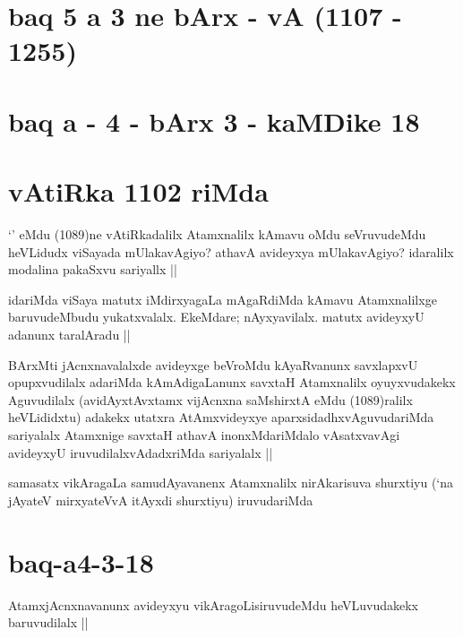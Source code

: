 \section*{baq 5 a 3 ne bArx - vA (1107 - 1255)}

\section*{baq a - 4 - bArx 3 - kaMDike 18}

\section*{vAtiRka 1102 riMda} 

\begin{artha}
`\stext' eMdu (1089)ne vAtiRkadalilx Atamxnalilx kAmavu oMdu seVruvudeMdu heVLidudx viSayada mUlakavAgiyo? athavA avideyxya mUlakavAgiyo? idaralilx modalina pakaSxvu sariyallx ||
\end{artha}

\begin{artha}
idariMda viSaya matutx iMdirxyagaLa mAgaRdiMda kAmavu Atamxnalilxge baruvudeMbudu yukatxvalalx. EkeMdare; nAyxyavilalx. matutx avideyxyU adanunx taralAradu ||
\end{artha}


\begin{artha}
BArxMti jAcnxnavalalxde avideyxge beVroMdu kAyaRvanunx savxlapxvU opupxvudilalx adariMda kAmAdigaLanunx savxtaH Atamxnalilx oyuyxvudakekx Aguvudilalx (avidAyxtAvxtamx vijAcnxna saMshirxtA eMdu (1089)ralilx heVLididxtu) adakekx utatxra AtAmxvideyxye aparxsidadhxvAguvudariMda sariyalalx Atamxnige savxtaH athavA inonxMdariMdalo vAsatxvavAgi avideyxyU iruvudilalxvAdadxriMda sariyalalx || 
\end{artha}


\begin{artha}
samasatx vikAragaLa samudAyavanenx Atamxnalilx nirAkarisuva shurxtiyu (`na jAyateV mirxyateVvA itAyxdi shurxtiyu) iruvudariMda
\end{artha}

\section*{baq-a4-3-18}

\begin{artha}
AtamxjAcnxnavanunx avideyxyu vikAragoLisiruvudeMdu heVLuvudakekx baruvudilalx ||
\end{artha}

